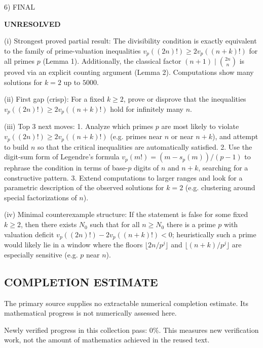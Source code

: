 6) FINAL

\textbf{UNRESOLVED}

(i) Strongest proved partial result: The divisibility condition is exactly equivalent to the family of prime-valuation inequalities $v_p((2n)!)\ge 2v_p((n+k)!)$ for all primes $p$ (Lemma 1). Additionally, the classical factor $(n+1)\mid\binom{2n}{n}$ is proved via an explicit counting argument (Lemma 2). Computations show many solutions for $k=2$ up to $5000$.

(ii) First gap (crisp): For a fixed $k\ge 2$, prove or disprove that the inequalities $v_p((2n)!)\ge 2v_p((n+k)!)$ hold for infinitely many $n$.

(iii) Top 3 next moves:
  1. Analyze which primes $p$ are most likely to violate $v_p((2n)!)\ge 2v_p((n+k)!)$ (e.g. primes near $n$ or near $n+k$), and attempt to build $n$ so that the critical inequalities are automatically satisfied.
  2. Use the digit-sum form of Legendre's formula $v_p(m!)=(m-s_p(m))/(p-1)$ to rephrase the condition in terms of base-$p$ digits of $n$ and $n+k$, searching for a constructive pattern.
  3. Extend computations to larger ranges and look for a parametric description of the observed solutions for $k=2$ (e.g. clustering around special factorizations of $n$).

(iv) Minimal counterexample structure: If the statement is false for some fixed $k\ge 2$, then there exists $N_0$ such that for all $n\ge N_0$ there is a prime $p$ with valuation deficit $v_p((2n)!)-2v_p((n+k)!)<0$; heuristically such a prime would likely lie in a window where the floors $\lfloor 2n/p^j\rfloor$ and $\lfloor (n+k)/p^j\rfloor$ are especially sensitive (e.g. $p$ near $n$).


\subsection*{COMPLETION ESTIMATE}
The primary source supplies no extractable numerical completion estimate. Its mathematical progress is not numerically assessed here.

Newly verified progress in this collection pass: $0\%$. This measures new verification work, not the amount of mathematics achieved in the reused text.
